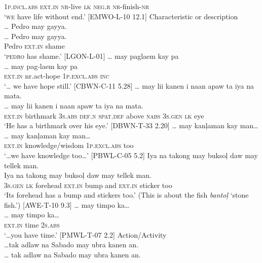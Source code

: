 1\textsc{p.incl.abs}  \textsc{ext.in}  \textsc{nr}-live  \textsc{lk}  \textsc{neg.r}  \textsc{nr}-finish-\textsc{nr} \\
\glt ‘\textsc{we} have life without end.’ [EMWO-L-10 12.1]
\z
\ea
\label{ex:characteristics-1}
Characteristic or description \\
… Pedro  may  gayya. \\\smallskip \gll … Pedro  may  gayya. \\
  {}  Pedro  \textsc{ext.in}  shame \\
\glt ‘\textsc{pedro} has shame.’ [LGON-L-01]
\z
\ea
… may  paglaem  kay  pa \\\smallskip \gll … may  pag-laem  kay  pa \\
{} \textsc{ext.in}  {nr.act}-hope  1\textsc{p.excl.abs}  \textsc{inc} \\
\glt ‘… we have hope still.’ [CBWN-C-11 5.28]
\z
\ea
… may  lii  kanen  i  naan  apaw  ta    iya  na  mata. \\\smallskip \gll … may  lii  kanen  i  naan  apaw  ta    iya  na  mata. \\
{} \textsc{ext.in}  birthmark  3\textsc{s.abs}  \textsc{def.n}  \textsc{spat.def} above  \textsc{nabs}  3\textsc{s.gen}  \textsc{lk}  eye \\
\glt ‘He has a birthmark over his eye.' [DBWN-T-33 2.20]
\z
\ea
… may  kanļaman  kay  man… \\\smallskip \gll … may  kanļaman  kay  man… \\
{} \textsc{ext.in}  knowledge/wisdom  1\textsc{p.excl.abs}  too \\
\glt ‘…we have knowledge too…’ [PBWL-C-05  5.2]
\z
\ea
Iya  na  takong  may  buksoļ  daw  may  tellek  man. \\\smallskip \gll Iya  na  takong  may  buksoļ  daw  may  tellek  man. \\
3\textsc{s.gen}  \textsc{lk}  forehead  \textsc{ext.in}  bump  and  \textsc{ext.in}  sticker  too \\
\glt ‘Its forehead has a bump and stickers too.' (This is about the fish \textit{bantoļ} ‘stone fish.’) [AWE-T-10 9.3]
\z
\ea
\label{ex:characteristics-2}
… may  timpo  ka…  \\\smallskip \gll … may  timpo  ka…  \\
{} \textsc{ext.in}  time  2\textsc{s.abs} \\
\glt ‘…you have time.’ [PMWL-T-07 2.2] 
\z
\ea
\label{ex:actions-1}
Action/Activity \\
…tak  adlaw  na  Sabado  may  ubra  kanen  an. \\\smallskip \gll … tak  adlaw  na  Sabado  may  ubra  kanen  an. \\
